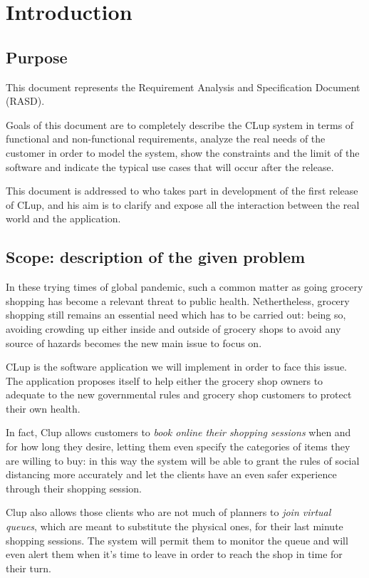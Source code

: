 \section{Introduction}
\label{sect:introduction}

\subsection{Purpose}
\label{subsect:purpose}

This document represents the Requirement Analysis and Specification Document (RASD). 

Goals of this document are to completely describe the CLup system in terms of functional and non-functional requirements, analyze the real needs of the customer in order to model the system, show the constraints and the limit of the software and indicate the typical use cases that will occur after the release. 

This document is addressed to who takes part in development of the first release of CLup, and his aim is to clarify and expose all the interaction between the real world and the application.

\subsection{Scope: description of the given problem}
\label{subsect:scope}

In these trying times of global pandemic, such a common matter as going grocery shopping has become a relevant threat to public health. 
Nethertheless, grocery shopping still remains an essential need which has to be carried out: being so, avoiding crowding up either inside and outside of grocery shops to avoid any source of hazards becomes the new main issue to focus on.

CLup is the software application we will implement in order to face this issue. The application proposes itself to help either the grocery shop owners to adequate to the new governmental rules and grocery shop customers to protect their own health.

In fact, Clup allows customers to \textit{book online their shopping sessions} when and for how long they desire, letting them even specify the categories of items they are willing to buy: in this way the system will be able to grant the rules of social distancing more accurately and let the clients have an even safer experience through their shopping session.

Clup also allows those clients who are not much of planners to \textit{join virtual queues}, which are meant to substitute the physical ones, for their last minute shopping sessions. The system will permit them to monitor the queue and will even alert them when it’s time to leave in order to reach the shop in time for their turn.

